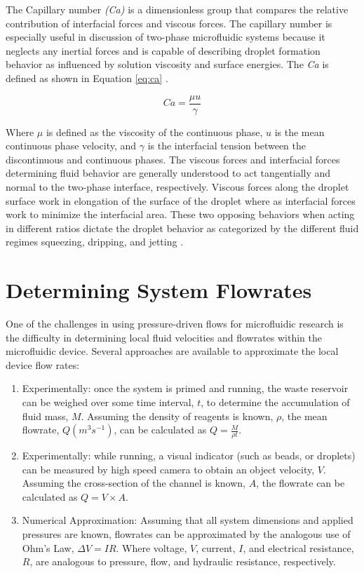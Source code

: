 The Capillary number \emph{(Ca)} is a dimensionless group that compares the relative contribution of interfacial forces and viscous forces. The capillary number is especially useful in discussion of two-phase microfluidic systems because it neglects any inertial forces and is capable of describing droplet formation behavior as influenced by solution viscosity and surface energies. The \emph{Ca} is defined as shown in Equation \vref{eq:ca} \cite{D??azNafr??a2013}.

\begin{equation}
Ca =\frac {\mu u}{\gamma}
\label{eq:ca}
\end{equation}

Where $\mu$ is defined as the viscosity of the continuous phase, $u$ is the mean continuous phase velocity, and $\gamma$ is the interfacial tension between the discontinuous and continuous phases. The viscous forces and interfacial forces determining fluid behavior are generally understood to act tangentially and normal to the two-phase interface, respectively. Viscous forces along the droplet surface work in elongation of the surface of the droplet where as interfacial forces work to minimize the interfacial area. These two opposing behaviors when acting in different ratios dictate the droplet behavior as categorized by the different fluid regimes squeezing, dripping, and jetting \cite{Shui2007}.


\section{Determining System Flowrates}

One of the challenges in using pressure-driven flows for microfluidic research is the difficulty in determining local fluid velocities and flowrates within the microfluidic device. Several approaches are available to approximate the local device flow rates:
\begin{enumerate}
\item Experimentally: once the system is primed and running, the waste reservoir can be weighed over some time interval, $t$, to determine the accumulation of fluid mass, $M$. Assuming the density of reagents is known, $\rho$, the mean flowrate, $Q (m^3s^{-1})$, can be calculated as $Q = \frac{M}{\rho t}$.
\item Experimentally: while running, a visual indicator (such as beads, or droplets) can be measured by high speed camera to obtain an object velocity, $V$. Assuming the cross-section of the channel is known, $A$, the flowrate can be calculated as $Q = V \times A$.
\item Numerical Approximation: Assuming that all system dimensions and applied pressures are known, flowrates can be approximated by the analogous use of Ohm's Law, $\Delta V=IR$. Where voltage, $V$, current, $I$, and electrical resistance, $R$, are analogous to pressure, flow, and hydraulic resistance, respectively.
\end{enumerate}

